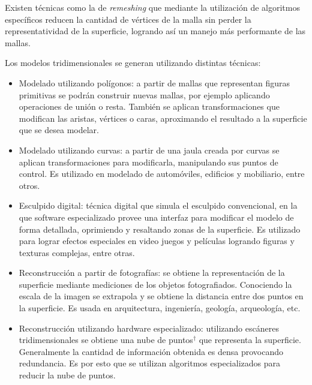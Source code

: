 Existen técnicas como la de \emph{remeshing} que mediante la utilización de algoritmos específicos reducen la cantidad de vértices de la malla sin perder la representatividad de la superficie, logrando así un manejo más performante de las mallas. %

Los modelos tridimensionales se generan utilizando distintas técnicas:
\begin{itemize}
  \item Modelado utilizando polígonos: a partir de mallas que representan figuras primitivas se podrán construir nuevas mallas, por ejemplo aplicando operaciones de unión o resta.
  También se aplican transformaciones que modifican las aristas, vértices o caras, aproximando el resultado a la superficie que se desea modelar.
  \item  Modelado utilizando curvas: a partir de una jaula creada por curvas se aplican transformaciones para modificarla, manipulando sus puntos de control. Es utilizado en modelado de automóviles, edificios y mobiliario, entre otros.
  \item Esculpido digital: técnica digital que simula el esculpido convencional, en la que software especializado provee una interfaz para modificar el modelo de forma detallada, oprimiendo y resaltando zonas de la superficie. Es utilizado para lograr efectos especiales en video juegos y películas logrando figuras y texturas complejas, entre otras.
  \item Reconstrucción a partir de fotografías: se obtiene la representación de la superficie mediante mediciones de los objetos fotografiados. Conociendo la escala de la imagen se extrapola y se obtiene la distancia entre dos puntos en la superficie. Es usada en arquitectura, ingeniería, geología, arqueología, etc.
  \item Reconstrucción utilizando hardware especializado: utilizando escáneres tridimensionales se obtiene una nube de puntos$^\dagger$ que representa la superficie. Generalmente la cantidad de información obtenida es densa provocando redundancia. Es por esto que se utilizan algoritmos especializados para reducir la nube de puntos.

\end{itemize}
